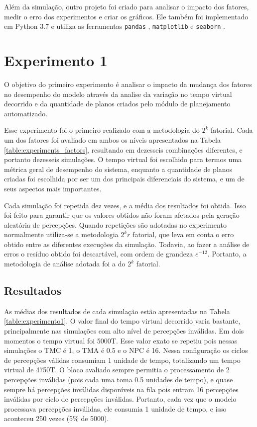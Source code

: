 Além da simulação, outro projeto foi criado para analisar o impacto dos fatores, medir o erro dos experimentos e criar os gráficos. Ele também foi implementado em Python 3.7 e utiliza as ferramentas \texttt{pandas} \cite{reback2020pandas}, \texttt{matplotlib} \cite{Hunter:2007} e \texttt{seaborn} \cite{Waskom_seaborn_statistical_data_2021}.

\section{Experimento 1}

O objetivo do primeiro experimento é analisar o impacto da mudança dos fatores no desempenho do modelo através da analise da variação no tempo virtual decorrido e da quantidade de planos criados pelo módulo de planejamento automatizado. 

Esse experimento foi o primeiro realizado com a metodologia do  $2^k$ fatorial. Cada um dos fatores foi avaliado em ambos os níveis apresentados na Tabela \ref{table:experiments_factors}, resultando em dezesseis combinações diferentes, e portanto dezesseis simulações. O tempo virtual foi escolhido para termos uma métrica geral de desempenho do sistema, enquanto a quantidade de planos criadas foi escolhida por ser um dos principais diferenciais do sistema, e um de seus aspectos mais importantes.

Cada simulação foi repetida dez vezes, e a média dos resultados foi obtida. Isso foi feito para garantir que os valores obtidos não foram afetados pela geração aleatória de percepções. Quando repetições são adotadas no experimento normalmente utiliza-se a metodologia $2^k r$ fatorial, que leva em conta o erro obtido entre as diferentes execuções da simulação. Todavia, ao fazer a análise de erros o resíduo obtido foi descartável, com ordem de grandeza $e^{-12}$. Portanto, a metodologia de análise adotada foi a do  $2^k$ fatorial.

\subsection{Resultados}

As médias dos resultados de cada simulação estão apresentadas na Tabela \ref{table:experimento1}. O valor final do tempo virtual decorrido varia bastante, principalmente nas simulações com alto nível de percepções inválidas. Em dois momentos o tempo virtual foi 5000T. Esse valor exato se repetiu pois nessas simulações o TMC é 1, o TMA é 0.5 e o NPC é 16. Nessa configuração os ciclos de percepções válidas consumiam 1 unidade de tempo, totalizando um tempo virtual de 4750T. O bloco avaliado sempre permitia o processamento de 2 percepções inválidas (pois cada uma toma 0.5 unidades de tempo), e quase sempre há percepções inválidas disponíveis na fila pois entram 16 percepções inválidas por ciclo de percepções inválidas. Portanto, cada vez que o modelo processava percepções inválidas, ele consumia 1 unidade de tempo, e isso aconteceu 250 vezes (5\% de 5000).

